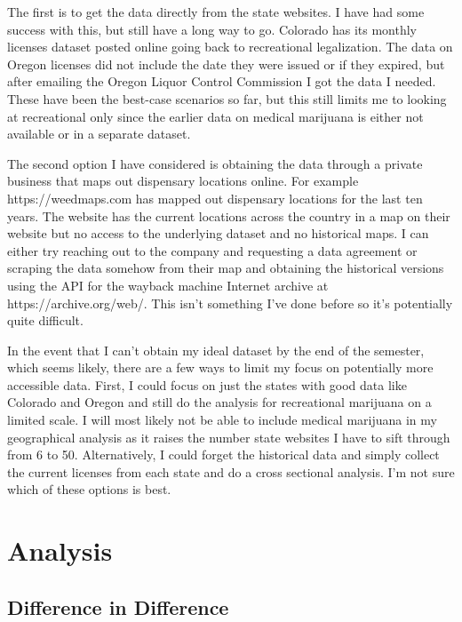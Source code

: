 \documentclass[11pt]{article}
\begin{document}
The first is to get the data directly from the state websites. I have had some success with this, but still have a long way to go. Colorado has its monthly licenses dataset posted online going back to recreational legalization. The data on Oregon licenses did not include the date they were issued or if they expired, but after emailing the Oregon Liquor Control Commission I got the data I needed. These have been the best-case scenarios so far, but this still limits me to looking at recreational only since the earlier data on medical marijuana is either not available or in a separate dataset. \par

The second option I have considered is obtaining the data through a private business that maps out dispensary locations online. For example https://weedmaps.com has mapped out dispensary locations for the last ten years. The website has the current locations across the country in a map on their website but no access to the underlying dataset and no historical maps. I can either try reaching out to the company and requesting a data agreement or scraping the data somehow from their map and obtaining the historical versions using the API for the wayback machine Internet archive at https://archive.org/web/. This isn't something I've done before so it's potentially quite difficult. \par


In the event that I can't obtain my ideal dataset by the end of the semester, which seems likely, there are a few ways to limit my focus on potentially more accessible data. First, I could focus on just the states with good data like Colorado and Oregon and still do the analysis for recreational marijuana on a limited scale. I will most likely not be able to include medical marijuana in my geographical analysis as it raises the number state websites I have to sift through from 6 to 50. Alternatively, I could forget the historical data and simply collect the current licenses from each state and do a cross sectional analysis. I'm not sure which of these options is best. 


\section{Analysis}

\subsection{Difference in Difference}
\end{document}
